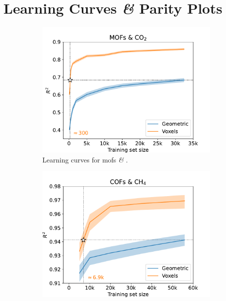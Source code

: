 \section{Learning Curves \textit{\&} Parity Plots}

\begin{figure}
	\centering
	\begin{subfigure}[b]{0.49\textwidth}
		\includegraphics[width=\textwidth]{fig/learning_curves_mofs.pdf}
		\caption{Learning curves for \glspl{mof} \textit{\&} .}
		\label{fig:learning_curves_mofs}
	\end{subfigure}
	\begin{subfigure}[b]{0.49\textwidth}
		\includegraphics[width=\textwidth]{fig/learning_curves_cofs.pdf}

\end{subfigure}
\end{figure}
